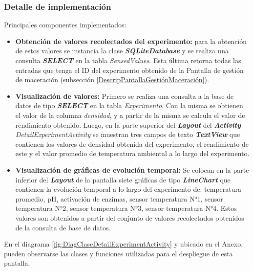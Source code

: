             \subsubsection{Detalle de implementación}
            \par Principales componentes implementados:
            \begin{itemize}
                \item \textbf{Obtención de valores recolectados del experimento:} para la obtención de estos valores se instancia la clase \textbf{\textit{\gls{SQLiteDatabase}}} y se realiza una consulta \textbf{\textit{\gls{SELECT}}} en la tabla \textit{SensedValues}. Esta última retorna todas las entradas que tenga el ID del experimento obtenido de la Pantalla de gestión de maceración (subsección \ref{DescripPantallaGestiónMaceración}).
                
                \item \textbf{Visualización de valores:} Primero se realiza una consulta a la base de datos de tipo \textbf{\textit{\gls{SELECT}}} en la tabla \textit{Experimento}. Con la misma se obtienen el valor de la columna \textit{densidad}, y a partir de la misma se calcula el valor de rendimiento obtenido. Luego, en la parte superior del \textbf{\textit{\gls{Layout}}} del \textbf{\textit{\gls{Activity}}} \textit{DetailExperimentActivity} se muestran tres campos de texto \textbf{\textit{\gls{TextView}}} que contienen los valores de densidad obtenida del experimento, el rendimiento de este y el valor promedio de temperatura ambiental a lo largo del experimento.
                
                \item \textbf{Visualización de gráficas de evolución temporal:} Se colocan en la parte inferior del \textbf{\textit{\gls{Layout}}} de la pantalla siete gráficas de tipo \textbf{\textit{\gls{LineChart}}} que contienen la evolución temporal a lo largo del experimento de: temperatura promedio, pH, activación de enzimas, sensor temperatura N°1, sensor temperatura N°2, sensor temperatura N°3, sensor temperatura N°4. Estos valores son obtenidos a partir del conjunto de valores recolectados obtenidos de la consulta de base de datos.
            \end{itemize}
            
            \par En el diagrama \ref{fig:DiagClaseDetailExperimentActivity} y ubicado en el Anexo, pueden observarse las clases y funciones utilizadas para el despliegue de esta pantalla.
            
